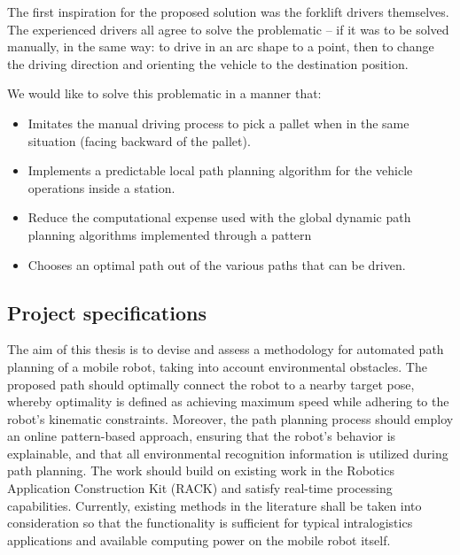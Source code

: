 The first inspiration for the proposed solution was the forklift drivers themselves. The experienced 
drivers all agree to solve the problematic – if it was to be solved manually, in the same way: to drive 
in an arc shape to a point, then to change the driving direction and orienting the vehicle to the 
destination position. 

We would like to solve this problematic in a manner that: 

\begin{itemize}
    \item Imitates the manual driving process to pick a pallet when in the same situation (facing backward 
    of the pallet).
    \item Implements a predictable local path planning algorithm for the vehicle operations inside a station. 
    \item Reduce the computational expense used with the global dynamic path planning algorithms implemented 
    through a pattern 
    \item Chooses an optimal path out of the various paths that can be driven.

\end{itemize}
\subsection{Project specifications}
The aim of this thesis is to devise and assess a methodology for automated path planning of a mobile 
robot, taking into account environmental obstacles. The proposed path should optimally connect the 
robot to a nearby target pose, whereby optimality is defined as achieving maximum speed while adhering 
to the robot’s kinematic constraints. Moreover, the path planning process should employ an online 
pattern-based approach, ensuring that the robot’s behavior is explainable, and that all environmental 
recognition information is utilized during path planning. 
The work should build on existing work in the Robotics Application Construction Kit (RACK) and satisfy 
real-time processing capabilities. Currently, existing methods in the literature shall be taken into 
consideration so that the functionality is sufficient for typical intralogistics applications and 
available computing power on the mobile robot itself. 

